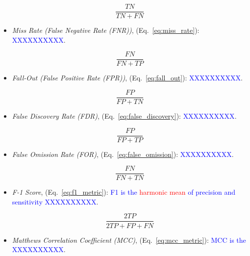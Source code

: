 \begin{itemize}
\begin{equation}
{\frac{TN}{TN+FN}}
\label{eq:npv}
\end{equation}

\item \textit{Miss Rate (False Negative Rate (FNR))}, (Eq.~\ref{eq:miss_rate}): \textcolor{blue}{XXXXXXXXXX}.

\begin{equation}
{\frac{FN}{FN+TP}}
\label{eq:miss_rate}
\end{equation}

\item \textit{Fall-Out (False Positive Rate (FPR))}, (Eq.~\ref{eq:fall_out}): \textcolor{blue}{XXXXXXXXXX}.

\begin{equation}
{\frac{FP}{FP+TN}}
\label{eq:fall_out}
\end{equation}

\item \textit{False Discovery Rate (FDR)}, (Eq.~\ref{eq:false_discovery}): \textcolor{blue}{XXXXXXXXXX}.

\begin{equation}
{\frac{FP}{FP+TP}}
\label{eq:false_discovery}
\end{equation}

\item \textit{False Omission Rate (FOR)}, (Eq.~\ref{eq:false_omission}): \textcolor{blue}{XXXXXXXXXX}.

\begin{equation}
{\frac{FN}{FN+TN}}
\label{eq:false_omission}
\end{equation}

\item \textit{F-1 Score}, (Eq.~\ref{eq:f1_metric}): \textcolor{blue}{F1 is the \textcolor{red}{harmonic mean} of precision and sensitivity XXXXXXXXXX}.

\begin{equation}
{\frac{2TP}{2TP+FP+FN}}
\label{eq:f1_metric}
\end{equation}

\item \textit{Matthews Correlation Coefficient (MCC)}, (Eq.~\ref{eq:mcc_metric}): \textcolor{blue}{MCC is the XXXXXXXXXX}.


\end{itemize}

